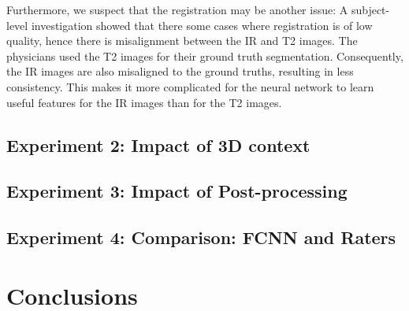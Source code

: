 Furthermore, we suspect that the registration may be another issue: A subject-level investigation showed that there some cases where registration is of low quality, hence there is misalignment between the IR and T2 images. The physicians used the T2 images for their ground truth segmentation. Consequently, the IR images are also misaligned to the ground truths, resulting in less consistency. This makes it more complicated for the neural network to learn useful features for the IR images than for the T2 images.





\subsection{Experiment 2: Impact of 3D context}
\subsection{Experiment 3: Impact of Post-processing}
\subsection{Experiment 4: Comparison: FCNN and Raters}
\section{Conclusions} \label{disc:conclusions}

\endinput